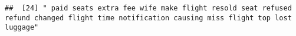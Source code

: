 \documentclass[
]{article}
\begin{document}
\begin{verbatim}
##  [24] " paid seats extra fee wife make flight resold seat refused refund changed flight time notification causing miss flight top lost luggage"                                                                                                                                                                                                                                                                                                                                                                                                                                                                                                                                                                                                                                                                                                                                                                                                                                                                                                                                                                                                                                                                                                                                                                                                                                                                                                                                                                                                                                                                                                                                                                                                                                                       

\end{verbatim}
\end{document}
